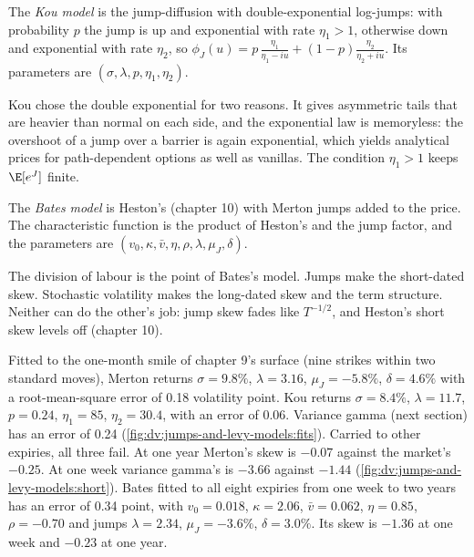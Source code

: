 \begin{definition}\label{def:dv:jumps-and-levy-models:kou}
The \emph{Kou model} is the jump-diffusion with double-exponential log-jumps: with probability
$p$ the jump is up and exponential with rate $\eta_1>1$, otherwise down and exponential with rate $\eta_2$, so
$\phi_J(u)=p\,\frac{\eta_1}{\eta_1-iu}+(1-p)\frac{\eta_2}{\eta_2+iu}$. Its parameters are
$(\sigma,\lambda,p,\eta_1,\eta_2)$.
\end{definition}

Kou chose the double exponential for two reasons. It gives asymmetric tails that are heavier than normal on
each side, and the exponential law is memoryless: the overshoot of a jump over a barrier is again exponential,
which yields analytical prices for path-dependent options as well as vanillas. The condition $\eta_1>1$ keeps $\E[e^J]$ finite.

\begin{definition}\label{def:dv:jumps-and-levy-models:bates}
The \emph{Bates model} is Heston's  (chapter 10) with Merton jumps
added to the price. The characteristic function is the product of Heston's and the jump factor, and the
parameters are $(v_0,\kappa,\bar v,\eta,\rho,\lambda,\mu_J,\delta)$.
\end{definition}

The division of labour is the point of Bates's model. Jumps make the short-dated skew. Stochastic
volatility makes the long-dated skew and the term structure. Neither can do the other's job: jump skew fades
like $T^{-1/2}$, and Heston's short skew levels off (chapter 10).

\begin{example}\label{ex:dv:jumps-and-levy-models:fits}
Fitted to the one-month smile of chapter 9's surface (nine strikes within two standard moves), Merton returns
$\sigma=9.8\%$, $\lambda=3.16$, $\mu_J=-5.8\%$, $\delta=4.6\%$ with a root-mean-square error of 0.18 volatility
point. Kou returns $\sigma=8.4\%$, $\lambda=11.7$, $p=0.24$, $\eta_1=85$, $\eta_2=30.4$, with an error of 0.06.
Variance gamma (next section) has an error of 0.24 (\cref{fig:dv:jumps-and-levy-models:fits}). Carried to other
expiries, all three fail. At one year Merton's skew is $-0.07$ against the market's $-0.25$. At one week variance
gamma's is $-3.66$ against $-1.44$ (\cref{fig:dv:jumps-and-levy-models:short}). Bates fitted to all eight expiries
from one week to two years has an error of 0.34 point, with $v_0=0.018$, $\kappa=2.06$, $\bar v=0.062$,
$\eta=0.85$, $\rho=-0.70$ and jumps $\lambda=2.34$, $\mu_J=-3.6\%$, $\delta=3.0\%$. Its skew is $-1.36$ at one week
and $-0.23$ at one year.
\end{example}

